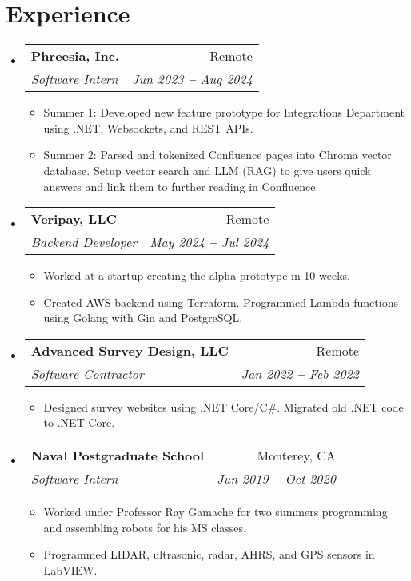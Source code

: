 \documentclass[12pt]{article}
\makeatletter
\newcommand{\entry}[1]{
  \item\small{
    {#1 \vspace{-2pt}}
  }
}
\newcommand{\subheading}[4]{
  \vspace{-2pt}\item
    \begin{tabular*}{0.97\textwidth}[t]{l@{\extracolsep{\fill}}r}
      \textbf{#1} & #2 \\
      \textit{\small#3} & \textit{\small #4} \\
    \end{tabular*}\vspace{-7pt}
}
\newcommand{\subheadingliststart}{\begin{itemize}[leftmargin=0.15in, label={}]}
\newcommand{\subheadinglistend}{\end{itemize}}
\newcommand{\entryliststart}{\begin{itemize}}
\newcommand{\entrylistend}{\end{itemize}\vspace{-5pt}}
\makeatother
\begin{document}
\section{Experience}
  \vspace{3pt}
  \subheadingliststart
    \subheading
      {Phreesia, Inc.}{Remote}
      {Software Intern}{Jun 2023 \textbf{--} Aug 2024}
        \entryliststart
            \entry{Summer 1: Developed new feature prototype for Integrations Department using .NET, Websockets, and REST APIs.}
            \entry{Summer 2: Parsed and tokenized Confluence pages into Chroma vector database. Setup vector search and LLM (RAG) to give users quick answers and link them to further reading in Confluence.}
        \entrylistend
    \subheading
      {Veripay, LLC}{Remote}
      {Backend Developer}{May 2024 \textbf{--} Jul 2024}
        \entryliststart
            \entry{Worked at a startup creating the alpha prototype in 10 weeks.}
            \entry{Created AWS backend using Terraform. Programmed Lambda functions using Golang with Gin and PostgreSQL.}
        \entrylistend
    \subheading
      {Advanced Survey Design, LLC}{Remote}
      {Software Contractor}{Jan 2022 \textbf{--} Feb 2022}
        \entryliststart
            \entry{Designed survey websites using .NET Core/C\#. Migrated old .NET code to .NET Core.}
        \entrylistend
    \subheading
      {Naval Postgraduate School}{Monterey, CA}
      {Software Intern}{Jun 2019 \textbf{--} Oct 2020}
        \entryliststart
            \entry{Worked under Professor Ray Gamache for two summers programming and assembling robots for his MS classes.}
            \entry{Programmed LIDAR, ultrasonic, radar, AHRS, and GPS sensors in LabVIEW.}
        \entrylistend
  \subheadinglistend

\end{document}
